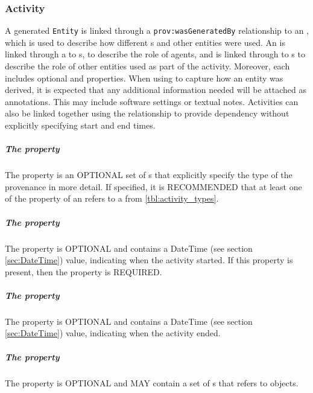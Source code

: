 \subsubsection{Activity}
\label{sec:prov:Activity}

A generated \texttt{Entity} is linked through a \texttt{prov:wasGeneratedBy} relationship to an , which is used to describe how different s and other entities were used. An  is linked through a  to s, to describe the role of agents, and is linked through  to s to describe the role of other entities used as part of the activity. Moreover, each  includes optional  and  properties. When using  to capture how an entity was derived, it is expected that any additional information needed will be attached as annotations. This may include software settings or textual notes. Activities can also be linked together using the  relationship to provide dependency without explicitly specifying start and end times.

\subparagraph{The  property}\label{sec:types:Activity}
The  property is an OPTIONAL set of s that explicitly specify the type of the provenance  in more detail. If specified, it is RECOMMENDED that at least one  of the  property of an  refers to a  from \ref{tbl:activity_types}.

\subparagraph{The  property}\label{sec:startedAtTime}
The  property is OPTIONAL and contains a DateTime (see section \ref{sec:DateTime}) value, indicating when the activity started.  If this property is present, then the  property is REQUIRED.

\subparagraph{The  property}\label{sec:endedAtTime}
The  property is OPTIONAL and contains a DateTime (see section \ref{sec:DateTime}) value, indicating when the activity ended.

\subparagraph{The  property}\label{sec:associations}
The  property is OPTIONAL and MAY contain a set of s that refers to  objects.

